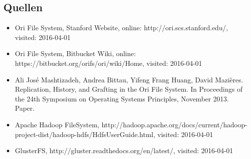 \subsection{Quellen}
\begin{itemize}
	\item Ori File System, Stanford Website, online: http://ori.scs.stanford.edu/, visited: 2016-04-01
	\item Ori File System, Bitbucket Wiki, online: https://bitbucket.org/orifs/ori/wiki/Home, visited: 2016-04-01
	\item Ali José Mashtizadeh, Andrea Bittau, Yifeng Frang Huang, David Mazières. Replication, History, and Grafting in the Ori File System. In Proceedings of the 24th Symposium on Operating Systems Principles, November 2013. Paper.
	\item Apache Hadoop FileSystem, http://hadoop.apache.org/docs/current/hadoop-project-dist/hadoop-hdfs/HdfsUserGuide.html, visited: 2016-04-01
	\item GlusterFS, http://gluster.readthedocs.org/en/latest/, visited: 2016-04-01
\end{itemize}

\clearpage